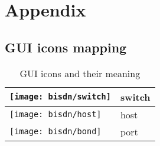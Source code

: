 \chapter{Appendix}

\section{GUI icons mapping}
\begin{table}[H]
    \centering
    \caption{GUI icons and their meaning}
    \label{tab:gui-mapping}
    \begin{tabular}{l | l}
        \centering
            \texttt{[image: bisdn/switch]}
        & switch     & \\ \hline 
            \texttt{[image: bisdn/host]}
        & host     & \\ \hline 
        \texttt{[image: bisdn/bond]}
        & port     & \\
   \end{tabular}
\end{table}
